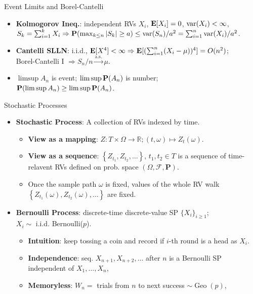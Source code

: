 \documentclass[landscape,a4paper]{article}
\begin{document}
\begin{cheatsheetcolumns}
\begin{card}{Event Limits and Borel-Cantelli}
\begin{itemize}
				\begin{itemize}
					\item proof: choose $\PP(|X_{n_k}-X|>1/k)<2^{-k}$.
				\end{itemize}
				\item \textbf{Kolmogorov Ineq.}: independent RVs $X_i$, $\mathbf{E}[X_i]=0$, $\operatorname{var}(X_i)<\infty$, $S_k=\sum_{i=1}^kX_i\Rightarrow \mathbf{P}(\max_{k\le n}|S_k|\ge a)\le\operatorname{var}(S_n)/a^2=\sum_{i=1}^n \operatorname{var}(X_i)/a^2$.
				\item \textbf{Cantelli SLLN}: i.i.d., $\mathbf{E}[X^4]<\infty\Rightarrow \mathbf{E}[(\sum_{i=1}^n(X_i-\mu))^4]=O(n^2)$;\\Borel-Cantelli I $\Rightarrow S_n/n\xrightarrow{\mathrm{a.s.}}\mu$.
				\item $\limsup A_n$ is event; $\limsup\mathbf{P}(A_n)$ is number;\\$\mathbf{P}(\limsup A_n)\ge\limsup\mathbf{P}(A_n)$.
			\end{itemize}
		\end{card}
		\begin{card}{Stochastic Processes}
			\begin{itemize}
				\item \textbf{Stochastic Process}: A collection of RVs indexed by time.
				\begin{itemize}
					\item \textbf{View as a mapping}: $Z\colon T\times \Omega \to \mathbb{R}; \left(t, \omega\right)\mapsto Z_t(\omega)$.
					\item \textbf{View as a sequence}:
					$\left\{Z_{t_1}, Z_{t_2}, \dots\right\}$, $t_1, t_2\in T$ is a sequence of time-relavent RVs defined on prob. space $\left(\Omega, \mathcal F, \mathbf P\right)$.
					\item Once the sample path $\omega$ is fixed, values of the whole RV walk $\left\{Z_{t_1}(\omega), Z_{t_2}(\omega), \dots\right\}$ are fixed.
				\end{itemize}
				\item \textbf{Bernoulli Process}: discrete-time discrete-value SP $\{X_i\}_{i\ge1}$;\\$X_i\sim$ i.i.d. Bernoulli($p$).
				\begin{itemize}
					\item \textbf{Intuition}: keep tossing a coin and record if $i$-th round is a head as $X_i$.
					\item \textbf{Independence}: seq. $X_{n+1}, X_{n+2}, \dots$ after $n$ is a Bernoulli SP independent of $X_1,\dots,X_n$,
					\item \textbf{Memoryless}: $W_n=$ trials from $n$ to next success $\sim\operatorname{Geo}(p)$,

\end{itemize}
\end{itemize}
\end{card}
\end{cheatsheetcolumns}
\end{document}
